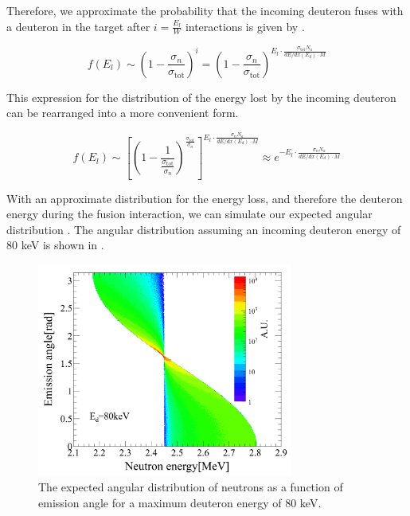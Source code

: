 Therefore, we approximate the probability that the incoming deuteron fuses with a deuteron in the target after $i = \frac{E_l}{W}$ interactions is given by .

\begin{equation}
        \label{eqn:nerix_minitron_energy_loss_1}
        f(E_l) \sim \left( 1 - \frac{\sigma_n}{\sigma_{\textrm{tot}}} \right)^i = \left( 1 - \frac{\sigma_n}{\sigma_{\textrm{tot}}} \right)^{E_l \cdot \frac{\sigma_{\textrm{tot}} N_a}{dE / dx(E_d) \cdot M}}
\end{equation}

This expression for the distribution of the energy lost by the incoming deuteron can be rearranged into a more convenient form.

\begin{equation}
        \label{eqn:nerix_minitron_energy_loss_2}
         f(E_l) \sim \left[ \left( 1 - \frac{1}{\frac{\sigma_{\textrm{tot}}}{\sigma_n}} \right)^{\frac{\sigma_{\textrm{tot}}}{\sigma_n}} \right] ^{E_l \cdot \frac{\sigma_n N_a}{dE / dx(E_d) \cdot M}} \approx e^{-E_l \cdot \frac{\sigma_n N_a}{dE / dx(E_d) \cdot M}}
\end{equation}

With an approximate distribution for the energy loss, and therefore the deuteron energy during the fusion interaction, we can simulate our expected angular distribution \cite{chadwick2011endf, guillaume_thesis}.  The angular distribution assuming an incoming deuteron energy of 80 keV is shown in .

\begin{figure}[t]
        \centering
	\includegraphics[width=0.75\textwidth]{nerix_yield_emission_angle}
	\caption{The expected angular distribution of neutrons as a function of emission angle for a maximum deuteron energy of 80 keV.}
	\label{fig:nerix_yield_emission_angle}
\end{figure}





